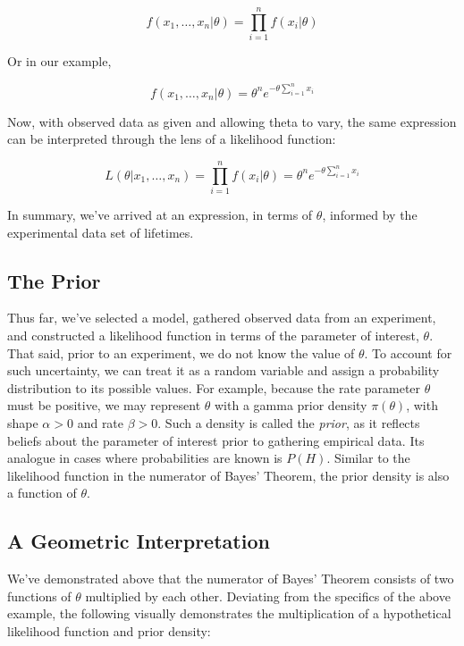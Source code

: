 \documentclass[12pt]{article}
\begin{document}
\begin{equation}
f(x_1, \ldots, x_n|\theta) = \prod_{i=1}^n f(x_i|\theta)
\end{equation}

\noindent Or in our example,

\begin{equation}
f(x_1, \ldots, x_n|\theta) = \theta^n e^{-\theta \sum_{i=1}^n x_i}
\end{equation}

\noindent Now, with observed data as given and allowing theta to vary, the same expression can be interpreted through the lens of a likelihood function:

\begin{equation}
L(\theta | x_1, \ldots, x_n) = \prod_{i=1}^n f(x_i|\theta) = \theta^n e^{-\theta \sum_{i=1}^n x_i}
\end{equation}

\noindent In summary, we've arrived at an expression, in terms of $\theta$, informed by the experimental data set of lifetimes.

\subsection*{The Prior}
\noindent Thus far, we've selected a model, gathered observed data from an experiment, and constructed a likelihood function in terms of the parameter of interest, $\theta$. That said, prior to an experiment, we do not know the value of $\theta$. To account for such uncertainty, we can treat it as a random variable and assign a probability distribution to its possible values. For example, because the rate parameter $\theta$ must be positive, we may represent $\theta$ with a gamma prior density $\pi(\theta)$, with shape $\alpha > 0$ and rate $\beta > 0$. Such a density is called the \textit{prior}, as it reflects beliefs about the parameter of interest prior to gathering empirical data. Its analogue in cases where probabilities are known is $P(H)$. Similar to the likelihood function in the numerator of Bayes' Theorem, the prior density is also a function of $\theta$.

\subsection*{A Geometric Interpretation}
\noindent We've demonstrated above that the numerator of Bayes' Theorem consists of two functions of $\theta$ multiplied by each other. Deviating from the specifics of the above example, the following visually demonstrates the multiplication of a hypothetical likelihood function and prior density:
\end{document}
